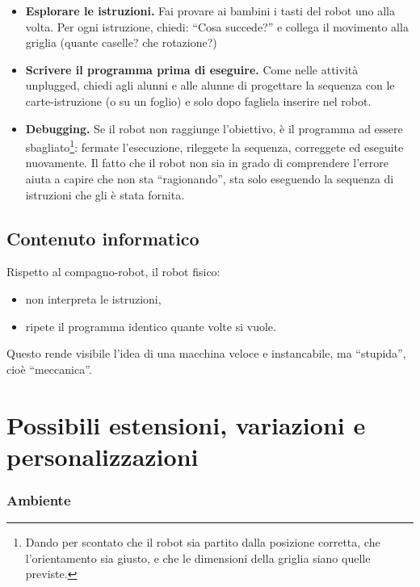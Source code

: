 \begin{itemize}
\item
  \textbf{Esplorare le istruzioni.} Fai provare ai bambini i tasti del robot uno alla volta. Per ogni istruzione, chiedi: ``Cosa succede?'' e collega il movimento alla griglia (quante caselle? che rotazione?)
\item
  \textbf{Scrivere il programma prima di eseguire.} Come nelle attività unplugged, chiedi agli alunni e alle alunne di progettare la sequenza con le carte-istruzione (o su un foglio) e solo dopo fagliela inserire nel robot.
\item
  \textbf{Debugging.} Se il robot non raggiunge l'obiettivo, è il programma ad essere sbagliato\footnote{Dando per scontato che il robot sia partito dalla posizione corretta, che l'orientamento sia giusto, e che le dimensioni della griglia siano quelle previste.}: fermate l'esecuzione, rileggete la sequenza, correggete ed eseguite nuovamente. Il fatto che il robot non sia in grado di comprendere l'errore aiuta a capire che non sta ``ragionando'', sta solo eseguendo la sequenza di istruzioni che gli è stata fornita.
\end{itemize}

\subsection{Contenuto informatico }\label{contenuto-informatico-5}

Rispetto al compagno-robot, il robot fisico:

\begin{itemize}
\item
  non interpreta le istruzioni,
\item
  ripete il programma identico quante volte si vuole.
\end{itemize}

Questo rende visibile l'idea di una macchina veloce e instancabile, ma ``stupida'', cioè ``meccanica''.

\section{Possibili estensioni, variazioni e personalizzazioni }\label{possibili-estensioni-variazioni-e-personalizzazioni-1}


\subsubsection{Ambiente}

